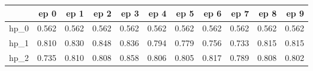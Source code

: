 \begin{tabular}{lrrrrrrrrrr}
\toprule
{} &   ep 0 &   ep 1 &   ep 2 &   ep 3 &   ep 4 &   ep 5 &   ep 6 &   ep 7 &   ep 8 &   ep 9 \\
\midrule
hp\_0 &  0.562 &  0.562 &  0.562 &  0.562 &  0.562 &  0.562 &  0.562 &  0.562 &  0.562 &  0.562 \\
hp\_1 &  0.810 &  0.830 &  0.848 &  0.836 &  0.794 &  0.779 &  0.756 &  0.733 &  0.815 &  0.815 \\
hp\_2 &  0.735 &  0.810 &  0.808 &  0.858 &  0.806 &  0.805 &  0.817 &  0.789 &  0.808 &  0.802 \\
\bottomrule
\end{tabular}
